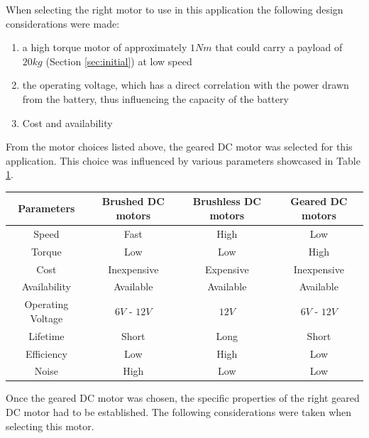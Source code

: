 When selecting the right motor to use in this application the following design considerations were made:
\begin{enumerate}
    \item a high torque motor of approximately $1 Nm$ that could carry a payload of $20 kg$ (Section \ref{sec:initial}) at low speed
    \item the operating voltage, which has a direct correlation with the power drawn from the battery, thus influencing the capacity of the battery
    \item Cost and availability
\end{enumerate}  
From the motor choices listed above, the geared \ac{DC} motor was selected for this application. This choice was influenced by various parameters showcased in Table \ref{table:comparedifferentmotrs}.

\begin{table}[ht]
  \begin{center}
    \leavevmode
    \begin{tabular}{|c|c|c|c|}\hline
    Parameters & Brushed \ac{DC} motors & Brushless \ac{DC} motors & Geared \ac{DC} motors \\\hline
    Speed & Fast & High & Low \\\hline
    Torque & Low & Low & High \\\hline
    Cost & Inexpensive & Expensive & Inexpensive \\\hline
    Availability & Available & Available & Available \\\hline
    Operating Voltage & $6 V$ - $12 V$ & $12 V$ & $6 V$ - $12 V$ \\\hline
    Lifetime & Short & Long & Short \\\hline
    Efficiency & Low & High & Low \\\hline
    Noise & High & Low & Low \\\hline
    \end{tabular}
    \label{table:comparedifferentmotrs}
  \end{center}
\end{table}

Once the geared \ac{DC} motor was chosen, the specific properties of the right geared \ac{DC} motor had to be established. The following considerations were taken when selecting this motor.

